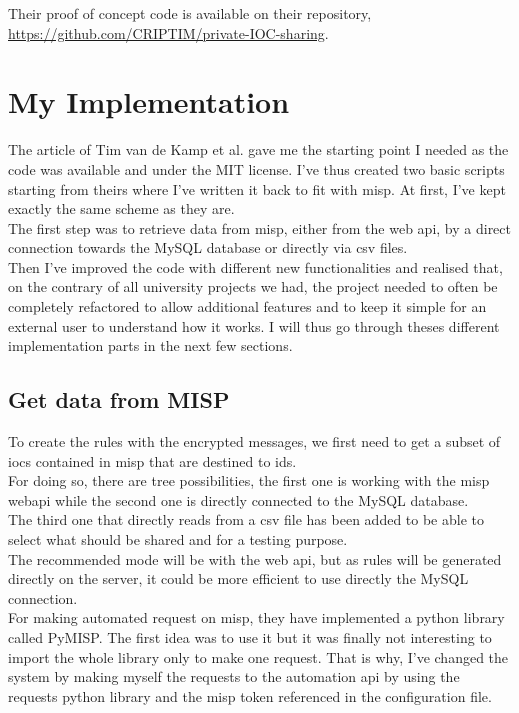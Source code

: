 \documentclass{eplmastersthesis}
\begin{document}
Their proof of concept code is available on their repository, \url{https://github.com/CRIPTIM/private-IOC-sharing}. 


\section{My Implementation}
The article of Tim van de Kamp et al. gave me the starting point I needed as the code was available and under the MIT license. I've thus created two basic scripts starting from theirs where I've written it back to fit with \gls{misp}. At first, I've kept exactly the same scheme as they are.\\
The first step was to retrieve data from \gls{misp}, either from the web \gls{api}, by a direct connection towards the MySQL database or directly via \gls{csv} files.\\
Then I've improved the code with different new functionalities and realised that, on the contrary of all university projects we had, the project needed to often be completely refactored to allow additional features and to keep it simple for an external user to understand how it works. I will thus go through theses different implementation parts in the next few sections.\\

\subsection{Get data from MISP}
To create the rules with the encrypted messages, we first need to get a subset of \gls{ioc}s contained in \gls{misp} that are destined to \gls{ids}. \\
For doing so, there are tree possibilities, the first one is working with the \gls{misp} web\gls{api} while the second one is directly connected to the MySQL database. \\
The third one that directly reads from a \gls{csv} file has been added to be able to select what should be shared and for a testing purpose.\\
The recommended mode will be with the web \gls{api}, but as rules will be generated directly on the server, it could be more efficient to use directly the MySQL connection.\\

For making automated request on \gls{misp}, they have implemented a python library called PyMISP. The first idea was to use it but it was finally not interesting to import the whole library only to make one request. That is why, I've changed the system by making myself the requests to the automation \gls{api} by using the requests python library and the \gls{misp} token referenced in the configuration file.\\
\end{document}
